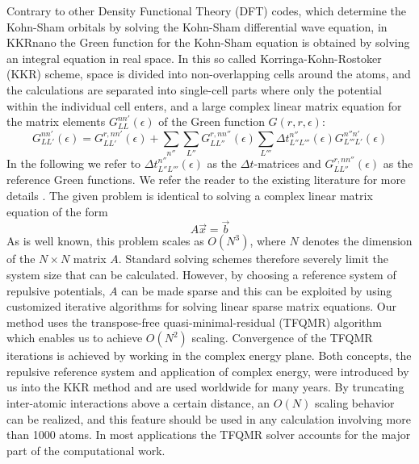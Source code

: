 \documentclass[graybox]{svmult}
\newcommand{\matr}[1]{\bm{\mathit{#1}}}
\begin{document}
Contrary to other Density Functional Theory (DFT) codes, which determine the Kohn-Sham orbitals by solving
the Kohn-Sham differential wave equation, in KKRnano the Green function for the Kohn-Sham
equation is obtained by solving an integral equation in real space. In this so called Korringa-Kohn-Rostoker
(KKR) scheme, space is divided
into non-overlapping cells around the atoms, and the calculations are separated into single-cell parts
where only the potential within the individual cell enters, and a large complex linear matrix equation for 
the matrix elements $G_{LL}^{nn'} (\epsilon)$ of the Green function $G(r, r , \epsilon)$:
\begin{equation}
	G_{LL'}^{nn'} (\epsilon) = G_{LL'}^{r,nn'} (\epsilon) + \sum_{n''} \sum_{L''}
	G_{LL''}^{r,nn''} (\epsilon) \sum_{L'''} \Delta t_{L'' L'''}^{n''} (\epsilon)
	G_{L'''L'}^{n''n'} (\epsilon)
	\label{eq:dyson_eq}
\end{equation}
In the following we refer to $\Delta t_{L'' L'''}^{n''} (\epsilon)$ as the $\Delta t$-matrices and
$G_{LL''}^{r,nn''} (\epsilon)$ as the reference Green functions. We refer the reader to the existing
literature for more details \cite{zeller_towards_2008}.
The given problem is identical to solving a complex linear matrix equation of the form
\begin{equation}
	\label{eq:axb}
	\matr{A} \vec{x} = \vec{b}
\end{equation}
As is well known, this problem scales as $O(N^3)$, where $N$ denotes the dimension of the $N \times N$
matrix $\matr{A}$. Standard solving schemes therefore severely limit the system size that can
be calculated.
However, by choosing a reference system of repulsive potentials,
$\matr{A}$ can be made sparse and this can be exploited
by using customized iterative algorithms for solving linear sparse matrix equations.
Our method uses the transpose-free quasi-minimal-residual (TFQMR) algorithm \cite{freund_qmr:_1991}
which enables us to achieve $O(N^2)$ scaling. 
Convergence of the TFQMR iterations is achieved by working in the complex energy plane. Both concepts,
the repulsive reference system and application of complex energy, were
introduced by us into the KKR method \cite{zeller_application_1982,zeller_theory_1995}
and are used worldwide for many years. 
By truncating inter-atomic interactions above a certain distance, an $O(N)$ scaling 
behavior can be realized, and this feature should be used in any calculation involving more than 1000 atoms.
In most applications the TFQMR solver accounts for the major part of the computational work.
\end{document}

